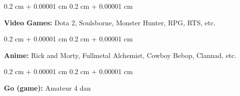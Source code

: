 \documentclass[10pt, letterpaper]{article}
\newenvironment{onecolentry}{
    \begin{adjustwidth}{
        0.2 cm + 0.00001 cm
    }{
        0.2 cm + 0.00001 cm
    }
}{
    \end{adjustwidth}
} %
\begin{document}
        \vspace{0.2 cm}

        \begin{onecolentry}
            \textbf{Video Games:} Dota 2, Soulsborne, Monster Hunter, RPG, RTS, etc.
        \end{onecolentry}

        \vspace{0.2 cm}

        \begin{onecolentry}
            \textbf{Anime:} Rick and Morty, Fullmetal Alchemist, Cowboy Bebop, Clannad, etc.
        \end{onecolentry}

        \vspace{0.2 cm}

        \begin{onecolentry}
            \textbf{Go (game):} Amateur 4 dan
        \end{onecolentry}


    
\end{document}
